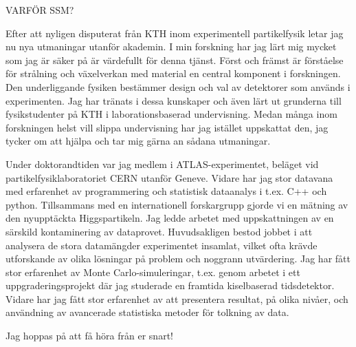 \documentclass[11pt, a4paper]{../awesome-cv} %
\begin{document}
\sloppy %

\makecvheader %

\makelettertitle %


\begin{cvletter}
\vspace{.2cm}
VARFÖR SSM?

Efter att nyligen disputerat från KTH inom experimentell partikelfysik letar jag nu nya utmaningar utanför akademin. %
I min forskning har jag lärt mig mycket som jag är säker på är värdefullt för denna tjänst.
Först och främst är förståelse för strålning och växelverkan med material en central komponent i forskningen.
Den underliggande fysiken bestämmer design och val av detektorer som används i experimenten.
Jag har tränats i dessa kunskaper och även lärt ut grunderna till fysikstudenter på KTH i laborationsbaserad undervisning.
Medan många inom forskningen helst vill slippa undervisning har jag istället uppskattat den, jag tycker om att hjälpa och tar mig gärna an sådana utmaningar. %

Under doktorandtiden var jag medlem i ATLAS-experimentet, beläget vid partikelfysiklaboratoriet CERN utanför Geneve.
Vidare har jag stor datavana med erfarenhet av programmering och statistisk dataanalys i t.ex. C++ och python. 
Tillsammans med en internationell forskargrupp gjorde vi en mätning av den nyupptäckta Higgspartikeln. 
Jag ledde arbetet med uppskattningen av en särskild kontaminering av dataprovet.
Huvudsakligen bestod jobbet i att analysera de stora datamängder experimentet insamlat, %
vilket ofta krävde utforskande av olika lösningar på problem och noggrann utvärdering. 
Jag har fått stor erfarenhet av Monte Carlo-simuleringar, t.ex. genom arbetet i ett uppgraderingsprojekt där jag studerade en framtida kiselbaserad tidsdetektor.
Vidare har jag fått stor erfarenhet av att presentera resultat, på olika nivåer, och användning av avancerade statistiska metoder för tolkning av data.




Jag hoppas på att få höra från er snart!

\end{cvletter}


\makeletterclosing %
\end{document}
